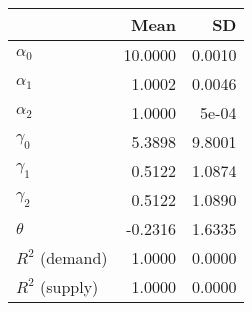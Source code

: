 
\begin{tabular}[t]{lrr}
\toprule
  & Mean & SD\\
\midrule
$\alpha_{0}$ & 10.0000 & 0.0010\\
$\alpha_{1}$ & 1.0002 & 0.0046\\
$\alpha_{2}$ & 1.0000 & 5e-04\\
$\gamma_{0}$ & 5.3898 & 9.8001\\
$\gamma_{1}$ & 0.5122 & 1.0874\\
$\gamma_{2}$ & 0.5122 & 1.0890\\
$\theta$ & -0.2316 & 1.6335\\
$R^{2}$ (demand) & 1.0000 & 0.0000\\
$R^{2}$ (supply) & 1.0000 & 0.0000\\
\bottomrule
\end{tabular}
